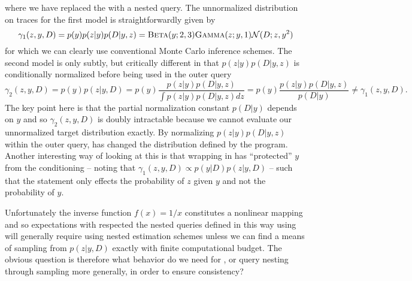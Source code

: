 \vspace{-15pt}
where we have replaced the  with a nested query.  The unnormalized distribution on traces for the first model
is straightforwardly given by
\[
\gamma_1(z,y,D) = p(y)p(z|y)p(D|y,z) = \textsc{Beta}(y;2,3) \textsc{Gamma}(z;y,1) \mathcal{N}(D;z,y^2)
\]
for which we can clearly use conventional Monte Carlo inference schemes.  The second model
is only subtly, but critically different in that $p(z|y)p(D|y,z)$ is conditionally normalized 
before being used in the outer query
\[
\gamma_2(z,y,D) = p(y)p(z|y,D) = p(y)\frac{p(z|y)p(D|y,z)}{\int p(z|y)p(D|y,z)dz} = p(y)\frac{p(z|y)p(D|y,z)}{p(D|y)} \neq \gamma_1(z,y,D).
\]
The key point here is that the partial normalization constant $p(D|y)$ depends on $y$ and so 
$\gamma_2(z,y,D)$ is doubly intractable because we cannot evaluate our unnormalized target
distribution exactly.  By normalizing $p(z|y)p(D|y,z)$ within the outer query, 
 \conditional has changed the distribution defined by the program.  Another interesting way of looking at this
 is that wrapping  in \conditional has ``protected'' $y$ from the conditioning -- noting
 that $\gamma_1 (z,y,D) \propto p(y|D)p(z|y,D)$ -- such that the \observe statement only effects the probability
 of $z$ given $y$ and not the probability of $y$.
 
 Unfortunately the inverse function $f(x) = 1/x$ constitutes
a nonlinear mapping and so expectations with respected the nested queries defined in this way using
\conditional will generally require using nested estimation schemes unless we can find a means of
sampling from $p(z|y,D)$ exactly with finite computational budget.
The obvious question is therefore what behavior do we need for \conditional, or query nesting through sampling
more generally, in order to ensure consistency?  

